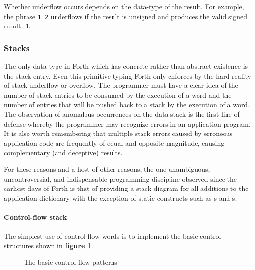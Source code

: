 Whether underflow occurs depends on the data-type of the result. For
example, the phrase \texttt{1 2} \word{-} underflows if the result is
unsigned and produces the valid signed result -1.


\subsubsection{Stacks} %

The only data type in Forth which has concrete rather than abstract
existence is the stack entry. Even this primitive typing Forth only
enforces by the hard reality of stack underflow or overflow. The
programmer must have a clear idea of the number of stack entries to
be consumed by the execution of a word and the number of entries that
will be pushed back to a stack by the execution of a word. The
observation of anomalous occurrences on the data stack is the first
line of defense whereby the programmer may recognize errors in an
application program. It is also worth remembering that multiple stack
errors caused by erroneous application code are frequently of equal
and opposite magnitude, causing complementary (and deceptive) results.

For these reasons and a host of other reasons, the one unambiguous,
uncontroversial, and indispensable programming discipline observed
since the earliest days of Forth is that of providing a stack diagram
for all additions to the application dictionary with the exception of
static constructs such as s and s.

\setcounter{paragraph}{1}
\paragraph{Control-flow stack} %

The simplest use of control-flow words is to implement the basic
control structures shown in \textbf{figure \ref{fig:basic}}.

\begin{figure}[ht]
  \begin{center}
	\caption{The basic control-flow patterns}
	\label{fig:basic}
  \end{center}
\end{figure}

